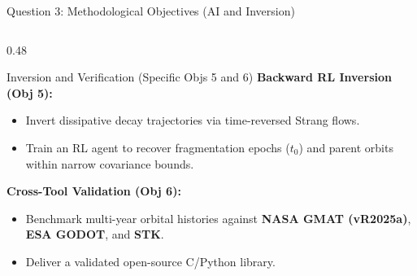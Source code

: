 \documentclass[aspectratio=169,10pt]{beamer}
\begin{document}
\begin{frame}{Question 3: Methodological Objectives (AI and Inversion)}
\begin{columns}[t]
        \begin{column}{0.48\textwidth}
            \begin{exampleblock}{Inversion and Verification (Specific Objs 5 and 6)}
                \small
                \textbf{Backward RL Inversion (Obj 5):}
                \begin{itemize}
                    \setlength{\itemsep}{2pt}
                    \item Invert dissipative decay trajectories via time-reversed Strang flows.
                    \item Train an RL agent to recover fragmentation epochs ($t_0$) and parent orbits within narrow covariance bounds.
                \end{itemize}
                \vspace{0.12cm}
                \textbf{Cross-Tool Validation (Obj 6):}
                \begin{itemize}
                    \setlength{\itemsep}{2pt}
                    \item Benchmark multi-year orbital histories against \textbf{NASA GMAT (vR2025a)}, \textbf{ESA GODOT}, and \textbf{STK}.
                    \item Deliver a validated open-source C/Python library.
                \end{itemize}
            \end{exampleblock}
        \end{column}
    \end{columns}
\end{frame}
\end{document}
